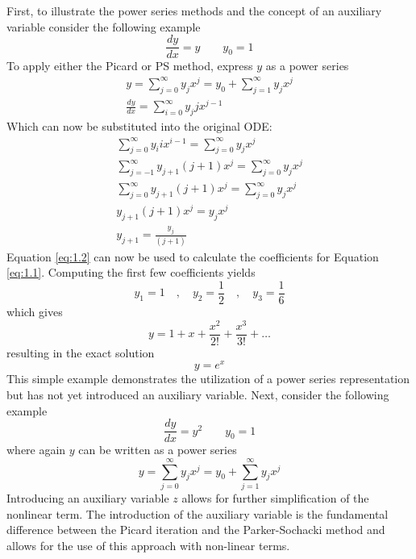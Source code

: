 \documentclass{article}
\begin{document}
First, to illustrate the power series methods and the concept of an auxiliary variable consider the following example
    \begin{equation}
        \frac{dy}{dx}=y\quad\quad y_0=1
    \end{equation}
To apply either the Picard or PS method, express $y$ as a power series
    \begin{gather}
            y=\sum_{j=0}^\infty y_jx^j=y_0+\sum_{j=1}^\infty y_{j}x^{j}\label{eq:1.1} \\    
            \frac{dy}{dx}=\sum_{i=0}^\infty y_jjx^{j-1}
    \end{gather}
Which can now be substituted into the original ODE:
    \begin{gather}
            \sum_{j=0}^\infty y_iix^{i-1}=\sum_{j=0}^\infty y_jx^j\\
            \sum_{j=-1}^\infty y_{j+1}(j+1)x^{j}=\sum_{j=0}^\infty y_jx^j\\
            \sum_{j=0}^\infty y_{j+1}(j+1)x^{j}=\sum_{j=0}^\infty y_jx^j\\
            y_{j+1}(j+1)x^{j}=y_jx^j\\
            y_{j+1}=\frac{y_j}{(j+1)} \label{eq:1.2} 
    \end{gather}
Equation \ref{eq:1.2} can now be used to calculate the coefficients for Equation \ref{eq:1.1}. Computing the first few coefficients yields
    \begin{equation}
        y_1=1\quad,\quad y_2=\frac{1}{2}\quad,\quad y_3=\frac{1}{6}
    \end{equation}
which gives
    \begin{equation}
        y=1+x+\frac{x^2}{2!}+\frac{x^3}{3!}+\dots
    \end{equation}
resulting in the exact solution
    \begin{equation}
        y=e^x
    \end{equation}
This simple example demonstrates the utilization of a power series representation but has not yet introduced an auxiliary variable. Next, consider the following example
        \begin{equation}\label{eq:1.6} 
        \frac{dy}{dx}=y^2\quad\quad y_0=1
    \end{equation}
where again $y$ can be written as a power series
    \begin{equation}
        y=\sum_{j=0}^\infty y_jx^j=y_0+\sum_{j=1}^\infty y_{j}x^{j}\label{eq:1.3}    
    \end{equation}
Introducing an auxiliary variable $z$ allows for further simplification of the nonlinear term. The introduction of the auxiliary variable is the fundamental difference between the Picard iteration and the Parker-Sochacki method and allows for the use of this approach with non-linear terms.
\end{document}
